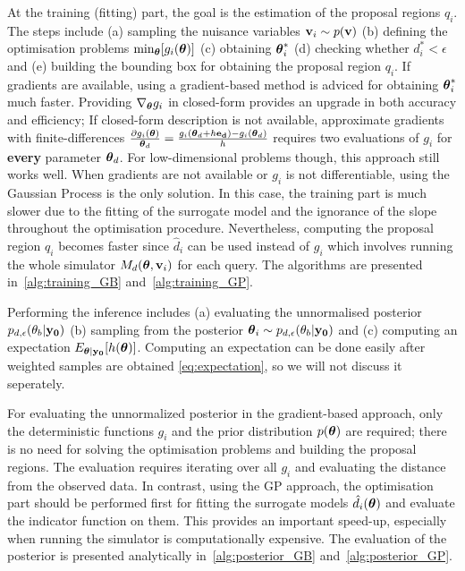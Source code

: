 \noindent
At the training (fitting) part, the goal is the estimation of the
proposal regions $q_i$. The steps include (a) sampling the nuisance
variables $\mathbf{v}_i \sim p(\mathbf{v})$ (b) defining the optimisation problems
$\min_{\boldsymbol{\theta}} [g_i(\boldsymbol{\theta})]$ (c) obtaining $\boldsymbol{\theta}_i^*$ (d) checking
whether $d_i^* < \epsilon$ and (e) building the bounding box for
obtaining the proposal region $q_i$. If gradients are available, using
a gradient-based method is adviced for obtaining $\boldsymbol{\theta}_i^*$ much
faster.  Providing $\nabla_{\boldsymbol{\theta}} g_i$ in closed-form provides an
upgrade in both accuracy and efficiency; If closed-form description is
not available, approximate gradients with finite-differences
$\frac{\partial g_i(\boldsymbol{\theta})}{\boldsymbol{\theta}_d} = \frac{g_i(\boldsymbol{\theta}_d + h
  \mathbf{e_d}) - g_i(\boldsymbol{\theta}_d)}{h}$ requires two evaluations of $g_i$ for
\textbf{every} parameter $\boldsymbol{\theta}_d$. For low-dimensional problems
though, this approach still works well. When gradients are not
available or $g_i$ is not differentiable, using the Gaussian Process
is the only solution. In this case, the training part is much slower
due to the fitting of the surrogate model and the ignorance of the
slope throughout the optimisation procedure. Nevertheless, computing
the proposal region $q_i$ becomes faster since $\hat{d}_i$ can be used
instead of $g_i$ which involves running the whole simulator
$M_d(\boldsymbol{\theta}, \mathbf{v}_i)$ for each query. The algorithms are presented
in~\ref{alg:training_GB} and~\ref{alg:training_GP}.

\noindent
Performing the inference includes (a) evaluating the unnormalised
posterior $p_{d, \epsilon}(\theta_b|\mathbf{y_0})$ (b) sampling from the
posterior $ \boldsymbol{\theta}_i \sim p_{d, \epsilon}(\theta_b|\mathbf{y_0})$ and (c)
computing an expectation $E_{\boldsymbol{\theta}|\mathbf{y_0}}[h(\boldsymbol{\theta})]$.  Computing
an expectation can be done easily after weighted samples are obtained
\ref{eq:expectation}, so we will not discuss it seperately.

\noindent
For evaluating the unnormalized posterior in the gradient-based
approach, only the deterministic functions $g_i$ and the prior
distribution $p(\boldsymbol{\theta})$ are required; there is no need for solving
the optimisation problems and building the proposal regions. The
evaluation requires iterating over all $g_i$ and evaluating the
distance from the observed data. In contrast, using the GP approach,
the optimisation part should be performed first for fitting the
surrogate models $\hat{d}_i(\boldsymbol{\theta})$ and evaluate the indicator
function on them. This provides an important speed-up, especially when
running the simulator is computationally expensive. The evaluation of
the posterior is presented analytically in~\ref{alg:posterior_GB}
and~\ref{alg:posterior_GP}.

